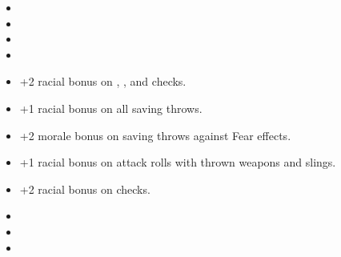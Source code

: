 
\begin{itemize}
\item {}
\item {}
\item {}
\item {}
\item +2 racial bonus on , , and  checks.
\item +1 racial bonus on all saving throws.
\item +2 morale bonus on saving throws against Fear effects.
\item +1 racial bonus on attack rolls with thrown weapons and slings.
\item +2 racial bonus on  checks.
\item {}
\item {}
\item {}
\end{itemize}
